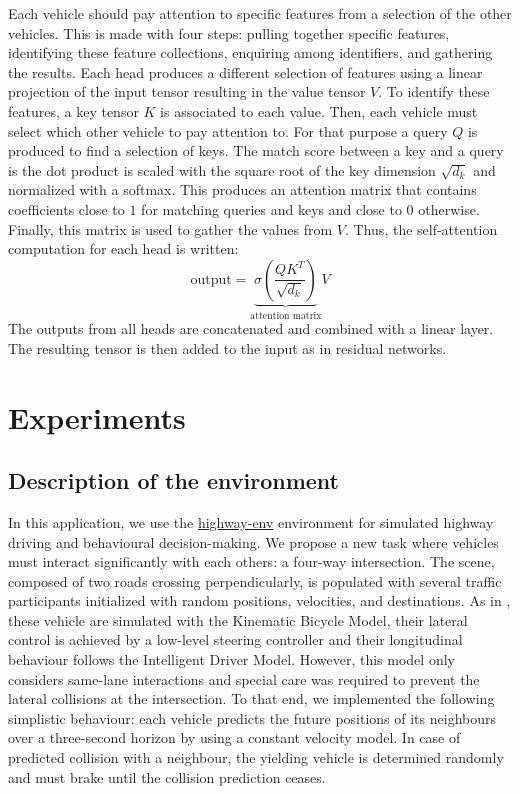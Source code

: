 \documentclass{article}
\begin{document}
{Each vehicle should pay attention to specific features from a selection of the other vehicles.
This is made with four steps: pulling together specific features, identifying these feature collections,
enquiring among identifiers, and gathering the results.
Each head produces a different selection of features using a linear projection of
the input tensor resulting in the value tensor $V$.
To identify these features, a key tensor $K$ is associated to each value.
Then, each vehicle must select which other vehicle to pay attention to.
For that purpose a query $Q$ is produced to find a selection of keys.
The match score between a key and a query is the dot product is scaled with the square root of the key
dimension $\sqrt{d_k}$ and normalized with a softmax.
This produces an attention matrix that contains coefficients close to $1$ for matching queries and keys
and close to $0$ otherwise.
Finally, this matrix is used to gather the values from $V$.
Thus, the self-attention computation for each head is written:
\begin{equation}
\text{output}=\underbrace{\sigma\left(\frac{QK^T}{\sqrt{d_k}}\right)}_{\text{attention matrix}}V
\label{eq_selfattention}
\end{equation}
The outputs from all heads are concatenated and combined with a linear layer.
The resulting tensor is then added to the input as in residual networks.


\section{Experiments}
\subsection{Description of the environment}

In this application, we use the \href{https://github.com/eleurent/highway-env}{highway-env} environment \citep{highway-env} for simulated highway driving and behavioural decision-making. We propose a new task where vehicles must interact significantly with each others: a four-way intersection. The scene, composed of two roads crossing perpendicularly, is populated with several traffic participants initialized with random positions, velocities, and destinations. As in \citep{highway-env}, these vehicle are simulated with the Kinematic Bicycle Model, their lateral control is achieved by a low-level steering controller and their longitudinal behaviour follows the Intelligent Driver Model. However, this model only considers same-lane interactions and special care was required to prevent the lateral collisions at the intersection. To that end, we implemented the following simplistic behaviour: each vehicle predicts the future positions of its neighbours over a three-second horizon by using a constant velocity model. In case of predicted collision with a neighbour, the yielding vehicle is determined randomly and must brake until the collision prediction ceases. 

}
\end{document}
